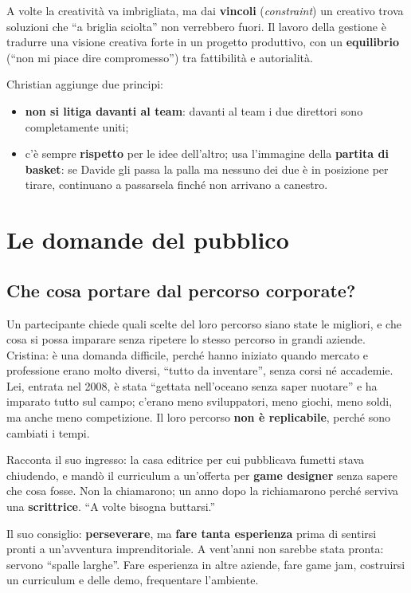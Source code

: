 A volte la creatività va imbrigliata, ma dai \textbf{vincoli} (\emph{constraint})
un creativo trova soluzioni che ``a briglia sciolta'' non verrebbero fuori. Il
lavoro della gestione è tradurre una visione creativa forte in un progetto
produttivo, con un \textbf{equilibrio} (``non mi piace dire compromesso'') tra
fattibilità e autorialità.

Christian aggiunge due principi:
\begin{itemize}
  \item \textbf{non si litiga davanti al team}: davanti al team i due direttori sono
        completamente uniti;
  \item c'è sempre \textbf{rispetto} per le idee dell'altro; usa l'immagine della
        \textbf{partita di basket}: se Davide gli passa la palla ma nessuno dei due è
        in posizione per tirare, continuano a passarsela finché non arrivano a
        canestro.
\end{itemize}

\section{Le domande del pubblico}
\label{sec:c3-4-domande}

\subsection{Che cosa portare dal percorso corporate?}

Un partecipante chiede quali scelte del loro percorso siano state le migliori, e
che cosa si possa imparare senza ripetere lo stesso percorso in grandi aziende.
Cristina: è una domanda difficile, perché hanno iniziato quando mercato e
professione erano molto diversi, ``tutto da inventare'', senza corsi né accademie.
Lei, entrata nel 2008, è stata ``gettata nell'oceano senza saper nuotare'' e ha
imparato tutto sul campo; c'erano meno sviluppatori, meno giochi, meno soldi, ma
anche meno competizione. Il loro percorso \textbf{non è replicabile}, perché sono
cambiati i tempi.

Racconta il suo ingresso: la casa editrice per cui pubblicava fumetti stava
chiudendo, e mandò il curriculum a un'offerta per \textbf{game designer} senza sapere
che cosa fosse. Non la chiamarono; un anno dopo la richiamarono perché serviva una
\textbf{scrittrice}. ``A volte bisogna buttarsi.''

Il suo consiglio: \textbf{perseverare}, ma \textbf{fare tanta esperienza} prima di
sentirsi pronti a un'avventura imprenditoriale. A vent'anni non sarebbe stata pronta:
servono ``spalle larghe''. Fare esperienza in altre aziende, fare game jam,
costruirsi un curriculum e delle demo, frequentare l'ambiente.

